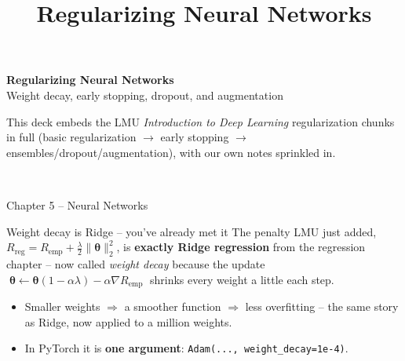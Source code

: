 \documentclass[aspectratio=43]{beamer}
\title{Regularizing Neural Networks}
\date{}
\begin{document}
\begin{frame}[plain]
  \vfill
  \begin{center}
    {\Large\color{popblue}\textbf{Regularizing Neural Networks}}\\[0.5em]
    {\large Weight decay, early stopping, dropout, and augmentation}\\[1.0em]
    \begin{minipage}{0.86\textwidth}\centering\small
      This deck embeds the LMU \emph{Introduction to Deep Learning} regularization chunks in
      full (basic regularization $\rightarrow$ early stopping $\rightarrow$
      ensembles/dropout/augmentation), with our own notes sprinkled in.
    \end{minipage}\\[0.8em]
  \end{center}
  \vfill
  {\footnotesize\color{gray} Chapter 5 -- Neural Networks}
\end{frame}



\begin{frame}{Weight decay is Ridge -- you've already met it}
  The penalty LMU just added, $R_{\text{reg}} = R_{\text{emp}} + \tfrac{\lambda}{2}\lVert\bm\theta\rVert_2^2$,
  is \textbf{exactly Ridge regression} from the regression chapter -- now called \emph{weight
  decay} because the update
  $\;\bm\theta \leftarrow \bm\theta(1-\alpha\lambda) - \alpha\nabla R_{\text{emp}}\;$ shrinks
  every weight a little each step.
  \vfill
  \begin{itemize}\small
    \item Smaller weights $\Rightarrow$ a smoother function $\Rightarrow$ less overfitting -- the
      same story as Ridge, now applied to a million weights.
    \item In PyTorch it is \textbf{one argument}: \texttt{Adam(..., weight\_decay=1e-4)}.
  \end{itemize}
  \vfill
\end{frame}
\end{document}
